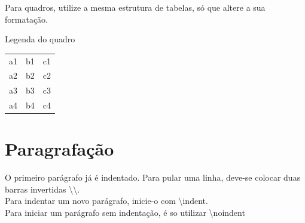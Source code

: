 Para quadros, utilize a mesma estrutura de tabelas, só que altere a sua formatação.
\begin{quadro}[htb]
\caption{\label{quadro_modelo}Legenda do quadro}
\begin{tabular}{ c c c }
a1 & b1 & c1 \\ 
a2 & b2 & c2 \\ 
a3 & b3 & c3 \\ 
a4 & b4 & c4 \\ 
\end{tabular}
\end{quadro}

\section{Paragrafação}
O primeiro parágrafo já é indentado. Para pular uma linha, deve-se colocar duas barras invertidas \textbackslash \textbackslash. \\
\indent Para indentar um novo parágrafo, inicie-o com \textbackslash indent.\\
\noindent Para iniciar um parágrafo sem indentação, é so utilizar \textbackslash noindent

